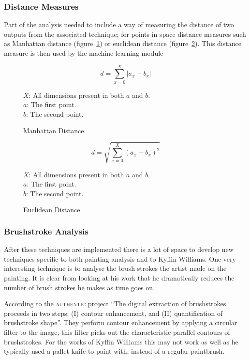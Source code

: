 \documentclass[11pt,fleqn,twoside]{article}
\begin{document}
\subsubsection{Distance Measures}
Part of the analysis needed to include a way of measuring the distance of two outputs from the
associated technique; for points in space distance measures such as Manhattan distance 
(figure~\ref{eq:manhattan}) or euclidean distance (figure~\ref{eq:euclidean}). This distance 
measure is then used by the machine learning module

\begin{figure}[p!]
\[
d = \sum^X_{x=0}{|a_x - b_x|}
\]

\(X\): All dimensions present in both \(a\) and \(b\).\\
\(a\): The first point.\\
\(b\): The second point.

\caption{Manhattan Distance}
\label{eq:manhattan}
\end{figure}

\begin{figure}[p]
\[
d = \sqrt{\sum^X_{x=0}{(a_x - b_x)^2}}
\]

\(X\): All dimensions present in both \(a\) and \(b\).\\
\(a\): The first point.\\
\(b\): The second point.
\caption{Euclidean Distance}
\label{eq:euclidean}
\end{figure}

\subsubsection{Brushstroke Analysis}
After these techniques are implemented there is a lot of space to develop new techniques specific 
to both painting analysis and to Kyffin Williams. One very interesting technique is to analyse the
brush strokes the artist made on the painting. It is clear from looking at his work that he 
dramatically reduces the number of brush strokes he makes as time goes on. 

According to the \textsc{authentic} project ``The digital extraction of brushstrokes proceeds in 
two steps: (I) contour enhancement, and (II) quantification of brushstroke 
shape''\cite{citeulike:11446581}. They perform contour enhancement by applying a circular filter to
the image, this filter picks out the characteristic parallel contours of brushstrokes. For the 
works of Kyffin Williams this may not work as well as he typically used a pallet knife %
to paint with, instead of a regular paintbrush.
\end{document}

